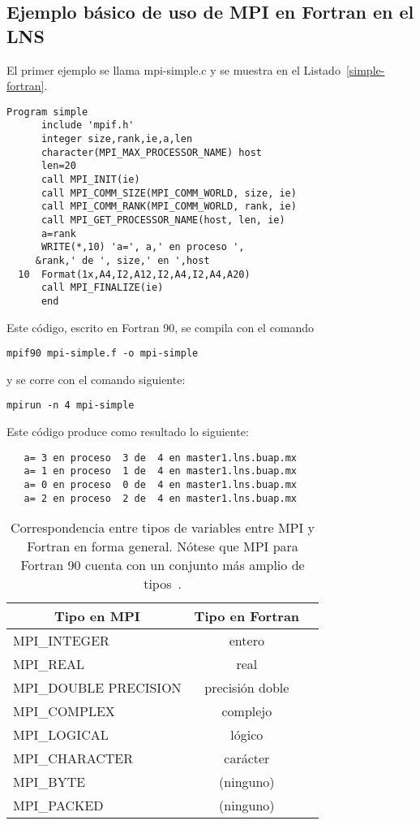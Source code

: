 \documentclass[letter]{jpconf}
\begin{document}
\subsection{Ejemplo b\'asico de uso de MPI en Fortran en el LNS}

El primer ejemplo se llama mpi-simple.c y se muestra en el Listado~\ref{simple-fortran}.
\begin{lstlisting}[float,floatplacement=H,label=simple-fortran,caption=Listado del programa  \texttt{mpi-simple.f} en Fortran]
      Program simple
      include 'mpif.h'
      integer size,rank,ie,a,len
      character(MPI_MAX_PROCESSOR_NAME) host
      len=20
      call MPI_INIT(ie)
      call MPI_COMM_SIZE(MPI_COMM_WORLD, size, ie)
      call MPI_COMM_RANK(MPI_COMM_WORLD, rank, ie)
      call MPI_GET_PROCESSOR_NAME(host, len, ie)
      a=rank
      WRITE(*,10) 'a=', a,' en proceso ',
     &rank,' de ', size,' en ',host
  10  Format(1x,A4,I2,A12,I2,A4,I2,A4,A20)
      call MPI_FINALIZE(ie)
      end
  \end{lstlisting}


Este c\'odigo, escrito en Fortran 90, se compila con el comando
\color{blue}
\begin{verbatim}
mpif90 mpi-simple.f -o mpi-simple
\end{verbatim}
\color{black}
y se corre con el comando siguiente:
\color{blue}
\begin{verbatim}
mpirun -n 4 mpi-simple
\end{verbatim}
\color{black}
Este c\'odigo produce como resultado lo siguiente:
\color{brown}
\begin{verbatim}
   a= 3 en proceso  3 de  4 en master1.lns.buap.mx 
   a= 1 en proceso  1 de  4 en master1.lns.buap.mx 
   a= 0 en proceso  0 de  4 en master1.lns.buap.mx 
   a= 2 en proceso  2 de  4 en master1.lns.buap.mx 
\end{verbatim}
\color{black}


\begin{table}[htbp]
\begin{center}
\begin{tabular}{|l|c|c|}
\hline
\hline
\hline \hline
\multicolumn{1}{c}{\textbf{Tipo en MPI}} & 
  \multicolumn{1}{c}{\textbf{Tipo en Fortran}} \\
 \hline \hline
MPI\_INTEGER & entero \\ \hline
MPI\_REAL & real \\ \hline
MPI\_DOUBLE PRECISION &  precisi\'on doble \\ \hline
MPI\_COMPLEX & complejo \\ \hline
MPI\_LOGICAL & l\'ogico \\ \hline
MPI\_CHARACTER & car\'acter \\ \hline
MPI\_BYTE & (ninguno) \\ \hline
MPI\_PACKED & (ninguno) \\ \hline
\end{tabular}
\caption{\label{tiposFortran} Correspondencia entre tipos de variables entre MPI y Fortran en forma general. N\'otese que MPI para Fortran 90 cuenta con un conjunto m\'as amplio de tipos~\cite{tipos-fortran}. }
\end{center}
\end{table}
\end{document}
